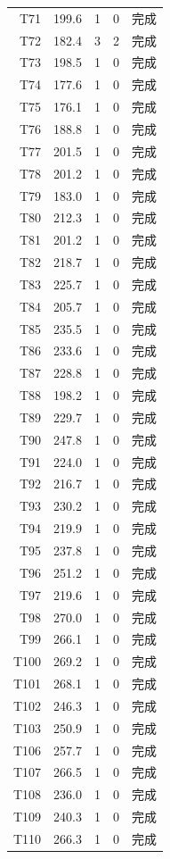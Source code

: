 \documentclass[a4paper,11pt]{article}
\begin{document}
\begin{table}[htbp]
\begin{tabular}{rcccl}
T71 & 199.6 & 1 & 0 & 完成 \\
T72 & 182.4 & 3 & 2 & 完成 \\
T73 & 198.5 & 1 & 0 & 完成 \\
T74 & 177.6 & 1 & 0 & 完成 \\
T75 & 176.1 & 1 & 0 & 完成 \\
T76 & 188.8 & 1 & 0 & 完成 \\
T77 & 201.5 & 1 & 0 & 完成 \\
T78 & 201.2 & 1 & 0 & 完成 \\
T79 & 183.0 & 1 & 0 & 完成 \\
T80 & 212.3 & 1 & 0 & 完成 \\
T81 & 201.2 & 1 & 0 & 完成 \\
T82 & 218.7 & 1 & 0 & 完成 \\
T83 & 225.7 & 1 & 0 & 完成 \\
T84 & 205.7 & 1 & 0 & 完成 \\
T85 & 235.5 & 1 & 0 & 完成 \\
T86 & 233.6 & 1 & 0 & 完成 \\
T87 & 228.8 & 1 & 0 & 完成 \\
T88 & 198.2 & 1 & 0 & 完成 \\
T89 & 229.7 & 1 & 0 & 完成 \\
T90 & 247.8 & 1 & 0 & 完成 \\
T91 & 224.0 & 1 & 0 & 完成 \\
T92 & 216.7 & 1 & 0 & 完成 \\
T93 & 230.2 & 1 & 0 & 完成 \\
T94 & 219.9 & 1 & 0 & 完成 \\
T95 & 237.8 & 1 & 0 & 完成 \\
T96 & 251.2 & 1 & 0 & 完成 \\
T97 & 219.6 & 1 & 0 & 完成 \\
T98 & 270.0 & 1 & 0 & 完成 \\
T99 & 266.1 & 1 & 0 & 完成 \\
T100 & 269.2 & 1 & 0 & 完成 \\
T101 & 268.1 & 1 & 0 & 完成 \\
T102 & 246.3 & 1 & 0 & 完成 \\
T103 & 250.9 & 1 & 0 & 完成 \\
T106 & 257.7 & 1 & 0 & 完成 \\
T107 & 266.5 & 1 & 0 & 完成 \\
T108 & 236.0 & 1 & 0 & 完成 \\
T109 & 240.3 & 1 & 0 & 完成 \\
T110 & 266.3 & 1 & 0 & 完成 \\

\end{tabular}
\end{table}
\end{document}
